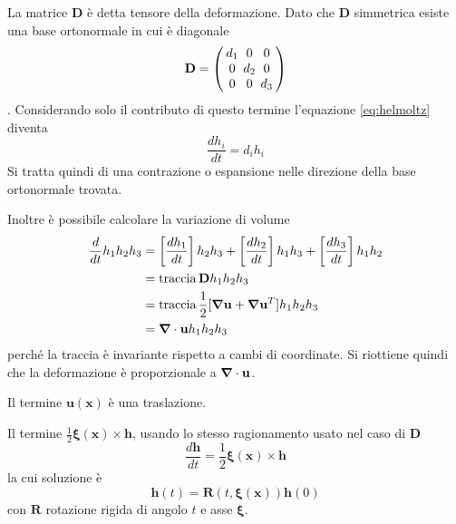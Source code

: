 La matrice $\mathbf{D}$ è detta tensore della deformazione. Dato che $\mathbf{D}$ simmetrica esiste una base ortonormale in cui è diagonale
\begin{equation}
\mathbf{D}={\setlength\arraycolsep{2pt} 
\left(\begin{array}{ccc} 
d_1 & 0 & 0 \\ 
0 & d_2 & 0 \\ 
0 & 0 & d_3 \\
\end{array}\right) 
}
\end{equation}.
Considerando solo il contributo di questo termine l'equazione \ref{eq:helmoltz} diventa 
\begin{equation*}
\frac{d h_i}{dt} = d_i h_i
\end{equation*}
Si tratta quindi di una contrazione o espansione nelle direzione della base ortonormale trovata.

Inoltre è possibile calcolare la variazione di volume
\begin{equation}
\begin{split}
\frac{d}{dt}h_1 h_2 h_3 &= \left [ \frac{dh_1}{dt} \right ] h_2h_3 + \left [ \frac{dh_2}{dt} \right ] h_1h_3 + \left [ \frac{dh_3}{dt} \right ] h_1h_2 \\
                                        &= \operatorname{traccia} \mathbf{D} h_1 h_2 h_3  \\
                                        &= \operatorname{traccia}  \frac{1}{2} [ \boldsymbol{\nabla}\mathbf{u} + \boldsymbol{\nabla}\mathbf{u} ^T] h_1 h_2 h_3 \\ 
                                        &= \boldsymbol{\nabla} \cdot \mathbf{u} h_1 h_2 h_3
\end{split}
\end{equation}
perché la traccia è invariante rispetto a cambi di coordinate. Si riottiene quindi che la deformazione è proporzionale a $ \boldsymbol{\nabla} \cdot \mathbf{u}$.

Il termine $\mathbf{u}(\mathbf{x})$ è una traslazione.

Il termine $\frac{1}{2}\boldsymbol{\xi}(\mathbf{x})\times\mathbf{h}$, usando lo stesso ragionamento usato nel caso di $\mathbf{D}$
\begin{equation*}
\frac{d\mathbf{h}}{dt}=\frac{1}{2}\boldsymbol{\xi}(\mathbf{x})\times\mathbf{h}
\end{equation*}
la cui soluzione è
\begin{equation*}
\mathbf{h}(t)=\mathbf{R}(t,\boldsymbol{\xi}(\mathbf{x}))\mathbf{h}(0)
\end{equation*}
con $\mathbf{R}$ rotazione rigida di angolo $t$ e asse $\boldsymbol{\xi}$. 

